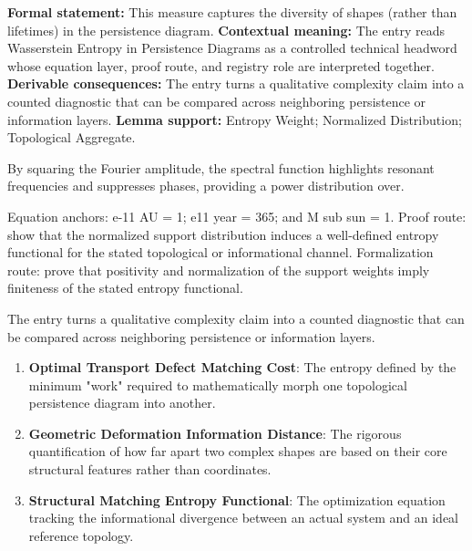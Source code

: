 \begingroup\footnotesize\setlength{\emergencystretch}{3em}\sloppy
\textbf{Formal statement:} This measure captures the diversity of shapes (rather than lifetimes) in the persistence diagram. \textbf{Contextual meaning:} The entry reads Wasserstein Entropy in Persistence Diagrams as a controlled technical headword whose equation layer, proof route, and registry role are interpreted together. \textbf{Derivable consequences:} The entry turns a qualitative complexity claim into a counted diagnostic that can be compared across neighboring persistence or information layers. \textbf{Lemma support:} Entropy Weight; Normalized Distribution; Topological Aggregate.\par
\endgroup

By squaring the Fourier amplitude, the spectral function highlights resonant frequencies and suppresses phases, providing a power distribution over.

Equation anchors: e-11 AU = 1; e11 year = 365; and M sub sun = 1. Proof route: show that the normalized support distribution induces a well-defined entropy functional for the stated topological or informational channel. Formalization route: prove that positivity and normalization of the support weights imply finiteness of the stated entropy functional.

The entry turns a qualitative complexity claim into a counted diagnostic that can be compared across neighboring persistence or information layers.
\endgroup

\begin{enumerate}[leftmargin=1.6em,itemsep=6pt,topsep=4pt]
\item \textbf{Optimal Transport Defect Matching Cost}: The entropy defined by the minimum "work" required to mathematically morph one topological persistence diagram into another.
\item \textbf{Geometric Deformation Information Distance}: The rigorous quantification of how far apart two complex shapes are based on their core structural features rather than coordinates.
\item \textbf{Structural Matching Entropy Functional}: The optimization equation tracking the informational divergence between an actual system and an ideal reference topology.
\end{enumerate}

